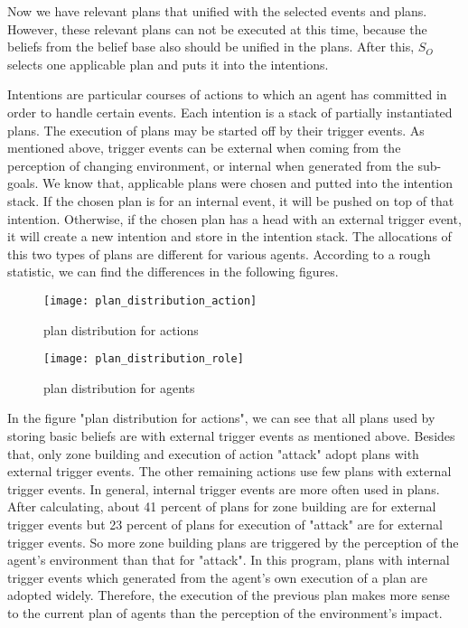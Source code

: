 Now we have relevant plans that unified with the selected events and plans. However, these relevant plans can not be executed at this time, because the beliefs from the belief base also should be unified in the plans. After this, $S_O$ selects one applicable plan and puts it into the intentions. 

Intentions are particular courses of actions to which an agent has committed in order to handle certain events. Each intention is a stack of partially instantiated plans\cite{rafael_Javabased_2007}. The execution of plans may be started off by their trigger events. As mentioned above, trigger events can be external when coming from the perception of changing environment, or internal when generated from the sub-goals. We know that, applicable plans were chosen and putted into the intention stack. If the chosen plan is for an internal event, it will be pushed on top of that intention. Otherwise, if the chosen plan has a head with an external trigger event, it will create a new intention and store in the intention stack. The allocations of this two types of plans are different for various agents. According to a rough statistic, we can find the differences in the following figures.
\begin{figure}
\centering
\begin{minipage}[!htbp]{\linewidth}
\texttt{[image: plan\_distribution\_action]}
\caption{plan distribution for actions}
\label{fig:plan_allocation}
\end{minipage}
\end{figure}
\begin{figure}
\centering
\begin{minipage}[!htbp]{\linewidth}
\texttt{[image: plan\_distribution\_role]}
\caption{plan distribution for agents}
\label{fig:baselinex}
\end{minipage}
\end{figure}
 
In the figure "plan distribution for actions", we can see that all plans used by storing basic beliefs are with external trigger events as mentioned above. Besides that, only zone building and execution of action "attack" adopt plans with external trigger events. The other remaining actions use few plans with external trigger events. In general, internal trigger events are more often used in plans. After calculating, about 41 percent of plans for zone building are for external trigger events but 23 percent of plans for execution of "attack" are for external trigger events. So more zone building plans are triggered by the perception of the agent’s environment than that for "attack". In this program, plans with internal trigger events which generated from the agent’s own execution of a plan are adopted widely. Therefore, the execution of the previous plan makes more sense to the current plan of agents than the perception of the environment's impact.

